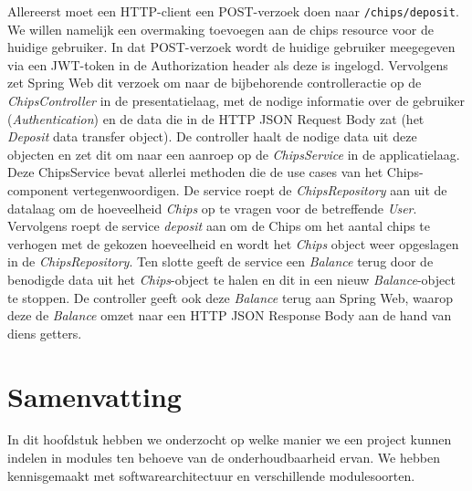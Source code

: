 Allereerst moet een HTTP-client een POST-verzoek doen naar 
\texttt{/chips/deposit}. We willen namelijk een overmaking toevoegen
aan de chips resource voor de huidige gebruiker. In dat POST-verzoek 
wordt de huidige gebruiker meegegeven via een JWT-token in de Authorization header
als deze is ingelogd. Vervolgens zet Spring Web dit verzoek om naar de bijbehorende 
controlleractie op de \emph{ChipsController} in de presentatielaag, met de
nodige informatie over de gebruiker (\emph{Authentication}) en de data die 
in de HTTP JSON Request Body zat (het \emph{Deposit} data transfer object).
De controller haalt de nodige data uit deze objecten en zet dit om naar 
een aanroep op de \emph{ChipsService} in de applicatielaag. Deze ChipsService
bevat allerlei methoden die de use cases van het Chips-component vertegenwoordigen.
De service roept de \emph{ChipsRepository} aan uit de datalaag om de hoeveelheid
\emph{Chips} op te vragen voor de betreffende \emph{User}. Vervolgens roept de 
service \emph{deposit} aan om de Chips om het aantal chips te verhogen met de 
gekozen hoeveelheid en wordt het \emph{Chips} object weer opgeslagen in de \emph{ChipsRepository}.
Ten slotte geeft de service een \emph{Balance} terug door de benodigde data uit het 
\emph{Chips}-object te halen en dit in een nieuw \emph{Balance}-object te stoppen.
De controller geeft ook deze \emph{Balance} terug aan Spring Web, waarop deze de 
\emph{Balance} omzet naar een HTTP JSON Response Body aan de hand van diens getters.

\newpage
\section{Samenvatting}
In dit hoofdstuk hebben we onderzocht op welke manier we een project kunnen 
indelen in modules ten behoeve van de onderhoudbaarheid ervan. We hebben 
kennisgemaakt met softwarearchitectuur en verschillende modulesoorten.

